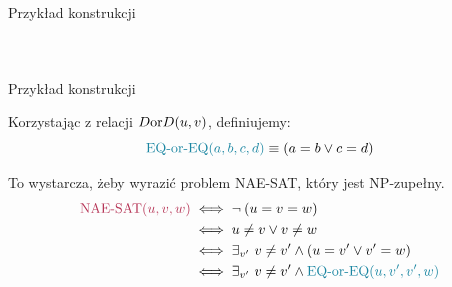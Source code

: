 
\begin{frame}{Przykład konstrukcji}

\begin{columns}
    \vspace{2.5em}
    \begin{figure}[H]
        \centering
        
    \end{figure}

    \vspace{1em}
    \begin{figure}[H]
        \hspace{3em}
        
    \end{figure}
    \begin{figure}[H]
        \centering
        
    \end{figure}
\end{columns}

\end{frame}


\begin{frame}{Przykład konstrukcji}

    Korzystając z relacji \(D\text{or}D(u,v)\), definiujemy:
    \[ \textcolor{cfblue}{\eqoreq(a,b,c,d)} \equiv (a=b \lor c=d) \]

    \pause
    To wystarcza, żeby wyrazić problem NAE-SAT, który jest NP-zupełny.
    \begin{align*} 
        \textcolor{cfred}{\text{NAE-SAT}(u,v,w)} & \iff \neg\:(u = v = w) \\
        & \iff u \neq v \lor v \neq w \\
        & \iff \exists_{v'} \ v \neq v' \land (u=v' \lor v'=w) \\
        & \iff \exists_{v'} \ v \neq v' \land \textcolor{cfblue}{\eqoreq(u, v', v', w)}
    \end{align*}

\end{frame}
 